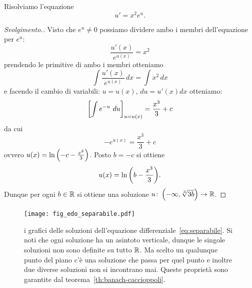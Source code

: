 \begin{example}
Risolviamo l'equazione 
\begin{equation}\label{eq:separabile}
  u' = x^2 e^u.
\end{equation}
\end{example}
%
\begin{proof}[Svolgimento.]
Visto che $e^u \neq 0$ possiamo dividere ambo i membri dell'equazione 
per $e^u$:
\[
  \frac{u'(x)}{e^{u(x)}} = x^2  
\]
prendendo le primitive di ambo i membri otteniamo
\[
 \int\frac{u'(x)}{e^{u(x)}}\, dx  = \int x^2\, dx 
\]
e facendo il cambio di variabili: $u=u(x)$, $du = u'(x) dx$ 
otteniamo:
\[
  {\left[ \int e^{-u}\, \, du \right]}_{u=u(x)} = \frac{x^3}{3} + c
\]
da cui 
\[
  -e^{u(x)} = \frac{x^3}{3} + c
\]
ovvero $u(x) = \ln{\left( -c -  \frac{x^3}{3} \right)}$.
Posto $b=-c$
si ottiene 
\[
  u(x) = \ln {\left( b-\frac{x^3}{3} \right)}.
\]
Dunque per ogni $b\in {\mathbb R}$ si ottiene una soluzione 
$u\colon \left(-\infty,\sqrt[3]{3b}\right)\to {\mathbb R}$.
\end{proof}
\newsavebox{\qrseparabile}
\begin{figure}
\centering
\texttt{[image: fig\_edo\_separabile.pdf]}
\caption{i grafici delle soluzioni dell'equazione differenziale~\eqref{eq:separabile}.
Si noti che ogni soluzione ha un asintoto verticale, dunque le singole 
soluzioni non sono definite su tutto ${\mathbb R}$.
Ma scelto un qualunque punto del piano c'è una soluzione che passa per 
quel punto e inoltre due diverse soluzioni non si incontrano mai.
Queste proprietà sono garantite dal teorema~\ref{th:banach-caccioppoli}.
\ifwidemargin\\\\\fi%
\usebox{\qrseparabile}}
\label{fig:separabile}
\end{figure}

